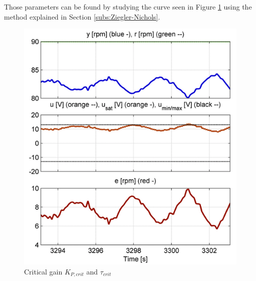 Those parameters can be found by studying the curve seen in Figure \ref{fig:osc_experiment} using the method explained in Section \ref{subs:Ziegler-Nichols}.

\begin{figure}[H]
\begin{center}
\includegraphics[width=0.6\linewidth]{images/general/Oscillation_Experiment}
\end{center}
\caption{Critical gain $K_{P,crit}$ and $\tau_{crit} $}
\label{fig:osc_experiment}
\end{figure}
\newpage
